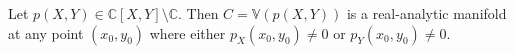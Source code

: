 Let $p(X, Y) \in \mathbb{C}[X, Y] \setminus \mathbb{C}$. Then $C = \mathbb{V}(p(X, Y))$ is a real-analytic manifold at any point $(x_0, y_0)$ where either $p_X(x_0, y_0) \neq 0$ or $p_Y(x_0, y_0) \neq 0$.
